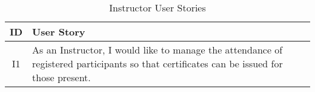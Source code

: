 \begin{table}[!htb]
  \centering
  \setlength{\aboverulesep}{0pt}
  \setlength{\belowrulesep}{0pt}
  \caption{Instructor User Stories}
  \label{tab:instructor-user-stories}
  \footnotesize
  \begin{tabularx}{\textwidth}{c|X}
    \toprule
    \rowcolor[rgb]{0.753,0.753,0.753} \textbf{ID} & \textbf{User Story}         \\
    \hline
    \rowcolor[rgb]{0.898,0.898,0.898} I1          & As an Instructor, I would like to manage the attendance of registered participants so that certificates can be issued for those present.                                           \\
    \bottomrule
  \end{tabularx}
\end{table}